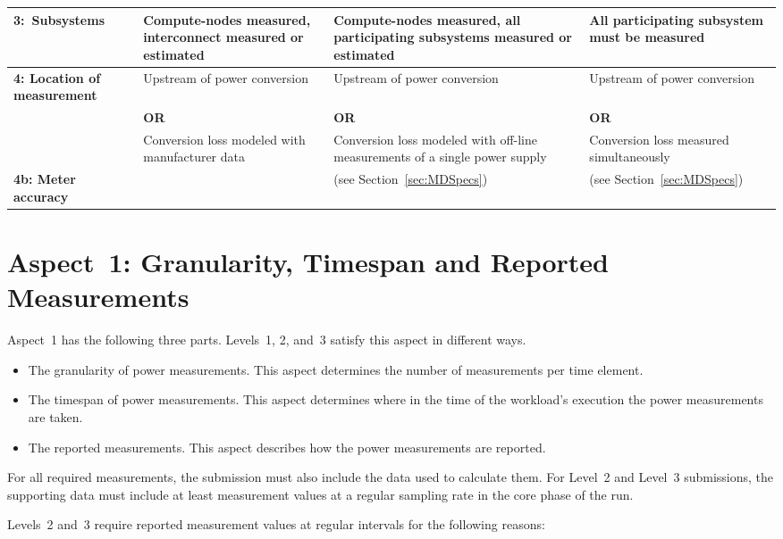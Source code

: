 \begin{table}
\begin{tabular}{|p{3.0cm}|p{3.5cm}|p{3.5cm}|p{3.5cm}|}
\textbf{3:~Subsystems} &
Compute-nodes measured, interconnect measured or estimated &
Compute-nodes measured, all participating subsystems measured or estimated &
All participating subsystem must be measured \\
\hline

\textbf{4: Location of measurement} &
Upstream of power conversion &
Upstream of power conversion &
Upstream of power conversion\\

 &
\centering \textbf{OR} &
\centering \textbf{OR} &
\centering \textbf{OR} \tabularnewline

 &
Conversion loss modeled with manufacturer data &
Conversion loss modeled with off-line measurements of a single power supply &
Conversion loss measured simultaneously \\
\hline
\textbf{4b: Meter accuracy} &
\SpecAccuracyLOne{} &
\SpecAccuracyLTwo{} (see Section~\ref{sec:MDSpecs})&
\SpecAccuracyLThree{} (see Section~\ref{sec:MDSpecs})\\
\hline
\end{tabular}
\end{table}

\section{Aspect~1: Granularity, Timespan and Reported Measurements}
\label{sec:A1GTRM}
\noindent
Aspect~1 has the following three parts.
Levels~1, 2, and~3 satisfy this aspect in different ways.

\begin{itemize}
\item
The granularity of power measurements.
This aspect determines the number of measurements per time element.
\item
The timespan of power measurements.
This aspect determines where in the time of the workload's execution the power measurements are taken.
\item
The reported measurements.
This aspect describes how the power measurements are reported.
\end{itemize}

\noindent
For all required measurements, the submission must also include the data used to calculate them.
For Level~2 and Level~3 submissions, the supporting data must include at least \MinMeasurementsCorePhaseLTwoThree{} measurement values at a regular sampling rate in the core phase of the run.
\wl

\noindent
Levels~2 and~3 require reported measurement values at regular intervals for the following reasons:


